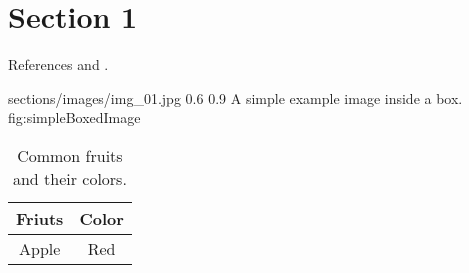 \documentclass[../../../main.tex]{subfiles}
\begin{document}
\section{Section 1}
References \parencite{Ref01}  and \parencite{Ref02}.

\begin{centerBoxImageStyle}
    {sections/images/img_01.jpg}     
    {0.6\linewidth}                         
    {0.9\linewidth}                         
    {A simple example image inside a box.}  
    {fig:simpleBoxedImage}               
\end{centerBoxImageStyle}


\begin{table}[h!] %
    \centering
    \begin{tabular}{|c|c|}     \hline
        Friuts & Color          \\ \hline
        Apple & Red             \\ \hline
    \end{tabular}
    \caption{Common fruits and their colors.}
\end{table}
\end{document}
